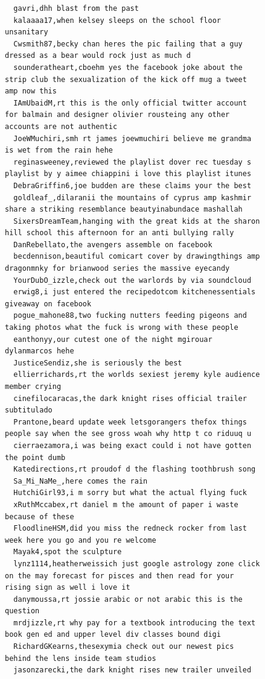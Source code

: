 \begin{figure}[htpb]
\begin{verbatim}
  gavri,dhh blast from the past
  kalaaaa17,when kelsey sleeps on the school floor unsanitary
  Cwsmith87,becky chan heres the pic failing that a guy dressed as a bear would rock just as much d
  sounderatheart,cboehm yes the facebook joke about the strip club the sexualization of the kick off mug a tweet amp now this
  IAmUbaidM,rt this is the only official twitter account for balmain and designer olivier rousteing any other accounts are not authentic
  JoeWMuchiri,smh rt james joewmuchiri believe me grandma is wet from the rain hehe
  reginasweeney,reviewed the playlist dover rec tuesday s playlist by y aimee chiappini i love this playlist itunes
  DebraGriffin6,joe budden are these claims your the best
  goldleaf_,dilaranii the mountains of cyprus amp kashmir share a striking resemblance beautyinabundace mashallah
  SixersDreamTeam,hanging with the great kids at the sharon hill school this afternoon for an anti bullying rally
  DanRebellato,the avengers assemble on facebook
  becdennison,beautiful comicart cover by drawingthings amp dragonmnky for brianwood series the massive eyecandy
  YourDubO_izzle,check out the warlords by via soundcloud
  erwig8,i just entered the recipedotcom kitchenessentials giveaway on facebook
  pogue_mahone88,two fucking nutters feeding pigeons and taking photos what the fuck is wrong with these people
  eanthonyy,our cutest one of the night mgirouar dylanmarcos hehe
  JusticeSendiz,she is seriously the best
  ellierrichards,rt the worlds sexiest jeremy kyle audience member crying
  cinefilocaracas,the dark knight rises official trailer subtitulado
  Prantone,beard update week letsgorangers thefox things people say when the see gross woah why http t co riduuq u
  cierraezamora,i was being exact could i not have gotten the point dumb
  Katedirections,rt proudof d the flashing toothbrush song
  Sa_Mi_NaMe_,here comes the rain
  HutchiGirl93,i m sorry but what the actual flying fuck
  xRuthMccabex,rt daniel m the amount of paper i waste because of these
  FloodlineHSM,did you miss the redneck rocker from last week here you go and you re welcome
  Mayak4,spot the sculpture
  lynz1114,heatherweissich just google astrology zone click on the may forecast for pisces and then read for your rising sign as well i love it
  danymoussa,rt jossie arabic or not arabic this is the question
  mrdjizzle,rt why pay for a textbook introducing the text book gen ed and upper level div classes bound digi
  RichardGKearns,thesexymia check out our newest pics behind the lens inside team studios
  jasonzarecki,the dark knight rises new trailer unveiled

\end{verbatim}
\end{figure}
